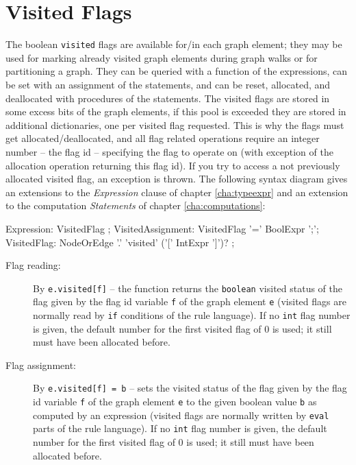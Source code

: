 \section{Visited Flags} \label{sub:visitedaccess}

The boolean \texttt{visited} flags are available for/in each graph element; 
they may be used for marking already visited graph elements during graph walks or for partitioning a graph.
They can be queried with a function of the expressions, can be set with an assignment of the statements, and can be reset, allocated, and deallocated with procedures of the statements.
The visited flags are stored in some excess bits of the graph elements, if this pool is exceeded they are stored in additional dictionaries, one per visited flag requested.
This is why the flags must get allocated/deallocated, and all flag related operations require an integer number -- the flag id -- specifying the flag to operate on (with exception of the allocation operation returning this flag id).
If you try to access a not previously allocated visited flag, an exception is thrown.
The following syntax diagram gives an extensions to the \emph{Expression} clause of chapter \ref{cha:typeexpr} and an extension to the computation \emph{Statements} of chapter \ref{cha:computations}:

\begin{rail}
	Expression: VisitedFlag ;
  VisitedAssignment: VisitedFlag '=' BoolExpr ';';
	VisitedFlag: NodeOrEdge '.' 'visited' ('[' IntExpr ']')? ;
\end{rail}

\begin{description}
\item[Flag reading:] By \texttt{e.visited[f]} -- the function returns the \texttt{boolean} visited status of the flag given by the flag id variable \texttt{f} of the graph element \texttt{e} (visited flags are normally read by \texttt{if} conditions of the rule language).
If no \texttt{int} flag number is given, the default number for the first visited flag of 0 is used; it still must have been allocated before.
\item[Flag assignment:] By \texttt{e.visited[f] = b} -- sets the visited status of the flag given by the flag id variable \texttt{f} of the graph element \texttt{e} to the given boolean value \texttt{b} as computed by an expression
(visited flags are normally written by \texttt{eval} parts of the rule language).
If no \texttt{int} flag number is given, the default number for the first visited flag of 0 is used; it still must have been allocated before.
\end{description}

